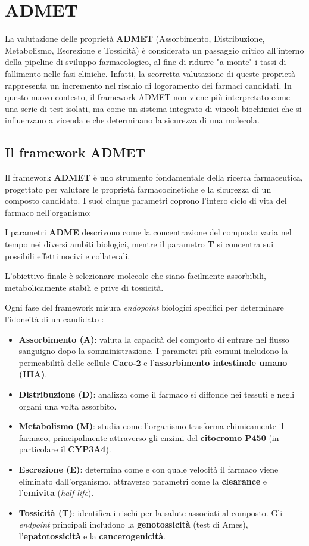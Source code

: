 \chapter{ADMET}
La valutazione delle proprietà \textbf{ADMET} (Assorbimento, Distribuzione, Metabolismo, Escrezione e Tossicità) è considerata un passaggio critico all'interno della pipeline di sviluppo farmacologico, al fine di ridurre "a monte" i tassi di fallimento nelle fasi cliniche. Infatti, la scorretta valutazione di queste proprietà rappresenta un incremento nel rischio di logoramento dei farmaci candidati.
In questo nuovo contesto, il framework ADMET non viene più interpretato come una serie di test isolati, ma come un sistema integrato di vincoli biochimici che si influenzano a vicenda e che determinano la sicurezza di una molecola. 
\section{Il framework ADMET}
Il framework \textbf{ADMET} è uno strumento fondamentale della ricerca 
farmaceutica, progettato per valutare le proprietà farmacocinetiche e la 
sicurezza di un composto candidato. I suoi cinque parametri coprono 
l'intero ciclo di vita del farmaco nell'organismo:

I parametri 
\textbf{ADME} descrivono come la concentrazione del composto varia nel 
tempo nei diversi ambiti biologici, mentre il parametro \textbf{T} si 
concentra sui possibili effetti nocivi e collaterali.

L'obiettivo finale è selezionare molecole che siano facilmente assorbibili, metabolicamente stabili e prive di tossicità.

Ogni fase del framework misura \textit{endopoint} biologici specifici per determinare l'idoneità di un candidato \cite{ferreiraADMETModelingApproaches2019}:
\begin{itemize}
    \item \textbf{Assorbimento (A)}: valuta la capacità del composto di 
    entrare nel flusso sanguigno dopo la somministrazione. I parametri 
    più comuni includono la permeabilità delle cellule \textbf{Caco-2} 
    e l'\textbf{assorbimento intestinale umano (HIA)}.
    \item \textbf{Distribuzione (D)}: analizza come il farmaco si diffonde 
    nei tessuti e negli organi una volta assorbito.
    \item \textbf{Metabolismo (M)}: studia come l'organismo trasforma 
    chimicamente il farmaco, principalmente attraverso gli enzimi del 
    \textbf{citocromo P450} (in particolare il \textbf{CYP3A4}).
    \item \textbf{Escrezione (E)}: determina come e con quale velocità 
    il farmaco viene eliminato dall'organismo, attraverso parametri come 
    la \textbf{clearance} e l'\textbf{emivita} (\textit{half-life}).
    \item \textbf{Tossicità (T)}: identifica i rischi per la salute 
    associati al composto. Gli \textit{endpoint} principali includono 
    la \textbf{genotossicità} (test di Ames),
    l'\textbf{epatotossicità} e la \textbf{cancerogenicità}.
\end{itemize}
